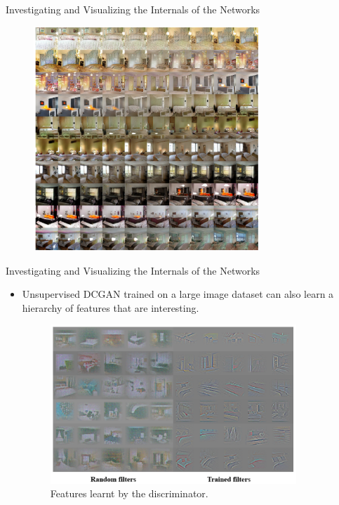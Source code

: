 \documentclass[10pt]{beamer}
\begin{document}
	\begin{frame}{Investigating and Visualizing the Internals of the Networks}
		\begin{figure}
			\includegraphics[width=23em]{figures/DCGAN-visualizing-internals-walking-in-latent.PNG}
		\end{figure}
	\end{frame}

	\begin{frame}{Investigating and Visualizing the Internals of the Networks}
		\begin{itemize}
			\item Unsupervised DCGAN trained on a large image dataset can also learn a hierarchy of features that are interesting.
			\begin{figure}
				\includegraphics[width=25em]{figures/DCGAN-visualizing-internals-filters.png}
				\caption{Features learnt by the discriminator.}
			\end{figure}
		\end{itemize}
	\end{frame}
\end{document}
